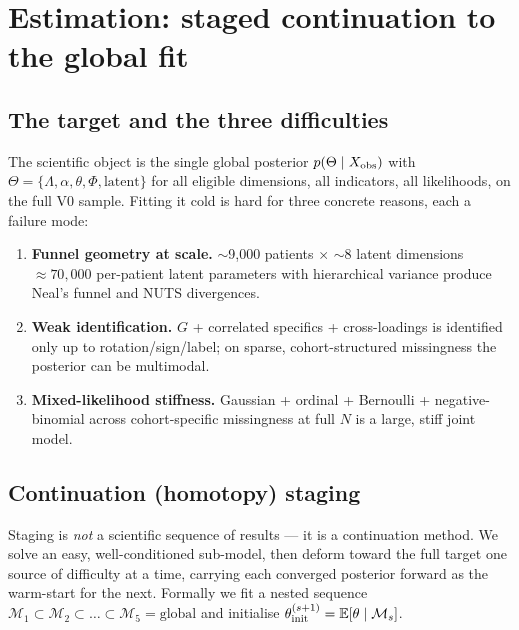 \section{Estimation: staged continuation to the global fit}
\label{sec:estimation}

\subsection{The target and the three difficulties}
The scientific object is the single global posterior $p(\Theta\mid X_{\mathrm{obs}})$ with
$\Theta=\{\Lambda,\alpha,\theta,\Phi,\text{latent}\}$ for all eligible dimensions, all indicators, all
likelihoods, on the full V0 sample. Fitting it cold is hard for three concrete reasons, each a failure mode:
\begin{enumerate}\setlength{\itemsep}{1pt}
  \item \textbf{Funnel geometry at scale.} $\sim$9{,}000 patients $\times$ $\sim$8 latent dimensions
  $\approx 70{,}000$ per-patient latent parameters with hierarchical variance produce Neal's funnel and NUTS
  divergences.
  \item \textbf{Weak identification.} $G$ + correlated specifics + cross-loadings is identified only up to
  rotation/sign/label; on sparse, cohort-structured missingness the posterior can be multimodal.
  \item \textbf{Mixed-likelihood stiffness.} Gaussian + ordinal + Bernoulli + negative-binomial across
  cohort-specific missingness at full $N$ is a large, stiff joint model.
\end{enumerate}

\subsection{Continuation (homotopy) staging}
Staging is \emph{not} a scientific sequence of results --- it is a continuation method. We solve an easy,
well-conditioned sub-model, then deform toward the full target one source of difficulty at a time, carrying
each converged posterior forward as the warm-start for the next. Formally we fit a nested sequence
$\mathcal{M}_1\subset\mathcal{M}_2\subset\dots\subset\mathcal{M}_5=\text{global}$ and initialise
$\theta_{\text{init}}^{(s+1)}=\mathbb{E}[\theta\mid\mathcal{M}_s]$.

